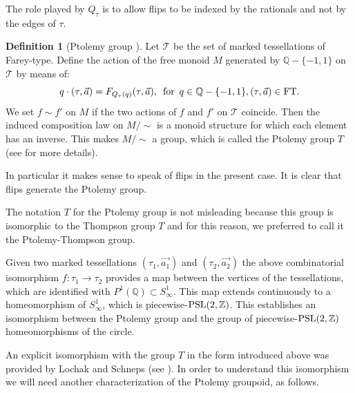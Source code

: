 \documentclass[twoside]{irmaems}
\theoremstyle{plain}
\theoremstyle{definition}
\newtheorem{definition}{Definition}[section]
\theoremstyle{remark}
\newcommand{\Z}{{\mathbb{Z}}}
\begin{document}
\vspace{0.2cm}
\noindent 
The role played by $Q_{\tau}$ is to allow flips to be indexed by 
the rationals and not by the edges of $\tau$. 

\begin{definition}[Ptolemy group \cite{pe0}]
Let ${\mathcal T}$ be the set of marked tessellations of Farey-type. 
Define the action of the free monoid  $M$ generated by ${\mathbb Q}-\{-1,1\}$
on ${\mathcal T}$ by means of:  
\[ q \cdot (\tau, \vec{a}) = F_{Q_{\tau}(q)}(\tau, \vec{a}),\,  \mbox{ for } \, 
q\in {\mathbb Q}-\{-1,1\}, (\tau, \vec{a})\in {\rm FT}.\]
We set  $f\sim f'$ on $M$  if the  two actions of $f$ and $f'$ on  
${\mathcal T}$ coincide. Then the induced composition law 
on  $M/\sim$ is a monoid structure for which each element has an inverse. This  
makes  $M/\sim$ a group, which is called the Ptolemy group $T$  (see \cite{pe0} for more details).  
\end{definition}


\vspace{0.2cm}
\noindent 
In particular it makes sense to speak of flips in the present case. 
It is clear that flips generate the Ptolemy group. 

\vspace{0.2cm}
\noindent 
The notation $T$ for the Ptolemy group is not misleading because 
this group is isomorphic to the Thompson group $T$ and for this reason, 
we preferred to call it the Ptolemy-Thompson group.  



\vspace{0.2cm}
\noindent 
Given two marked tessellations $(\tau_1,\vec{a_1})$ and $(\tau_2,\vec{a_2})$ 
the above combinatorial isomorphism $f:\tau_1\to \tau_2$   
provides a map between the vertices of the tessellations, 
which are identified with $P^1(\mathbb Q)\subset S^1_{\infty}$. 
This map extends continuously to a homeomorphism of  $S^1_{\infty}$, 
which is piecewise-${\rm PSL}(2,\Z)$. 
This establishes an isomorphism between the Ptolemy group and 
the group of piecewise-${\rm PSL}(2,\Z)$ homeomorphisms of the circle. 

\vspace{0.2cm}
\noindent 
An explicit isomorphism with the group $T$ in the form introduced above 
was provided by Lochak and Schneps (see \cite{lo-sc}). 
In order to understand this isomorphism we will need another 
characterization of the Ptolemy groupoid, as follows. 
\end{document}
